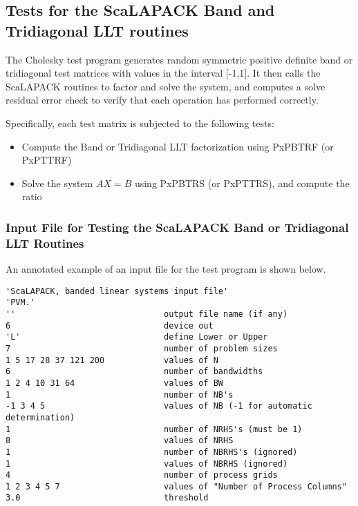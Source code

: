 \documentclass[11pt]{report}
\newcommand{\dent}{\hspace*{\parindent}}
\begin{document}
\subsection{Tests for the ScaLAPACK Band and Tridiagonal LLT routines}

The Cholesky test program generates random symmetric positive definite
band or tridiagonal test matrices with values in the interval [-1,1].
It then calls the ScaLAPACK 
routines to factor and solve the system, and computes a solve
residual error check to verify that each operation has performed 
correctly.

Specifically, each test matrix is subjected to the following tests:

\begin{itemize}
\item
Compute the Band or Tridiagonal LLT factorization using PxPBTRF (or PxPTTRF)
\item
Solve the system $A X = B$ using PxPBTRS (or PxPTTRS), and compute the ratio
\end{itemize}

\subsubsection{Input File for Testing the ScaLAPACK Band or Tridiagonal
LLT Routines}
\dent
An annotated example of an input file for the
test program is shown below.

\begin{verbatim}
'ScaLAPACK, banded linear systems input file'
'PVM.'
''                              output file name (if any)
6                               device out
'L'                             define Lower or Upper
7                               number of problem sizes
1 5 17 28 37 121 200            values of N
6                               number of bandwidths
1 2 4 10 31 64                  values of BW
1                               number of NB's
-1 3 4 5                        values of NB (-1 for automatic determination)
1                               number of NRHS's (must be 1)
8                               values of NRHS
1                               number of NBRHS's (ignored)
1                               values of NBRHS (ignored)
4                               number of process grids
1 2 3 4 5 7                     values of "Number of Process Columns"
3.0                             threshold
\end{verbatim}
\end{document}
